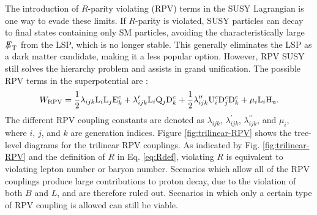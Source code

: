 \documentclass[12pt]{thesis}  %
\providecommand{\PU}{\ensuremath{\cmsSymbolFace{U}}\xspace}
\providecommand{\PD}{\ensuremath{\cmsSymbolFace{D}}\xspace}
\providecommand{\PQ}{\ensuremath{\cmsSymbolFace{Q}}\xspace}
\providecommand{\PE}{\ensuremath{\cmsSymbolFace{E}}\xspace}
\providecommand{\PL}{\ensuremath{\cmsSymbolFace{L}}\xspace}
\def\eslash{\ensuremath{{\hbox{$E$\kern-0.6em\lower-.05ex\hbox{/}\kern0.10em}}}}
\def\met{\mbox{$\eslash_\text{T}$}\xspace} %
\begin{document}
The introduction of $R$-parity violating (RPV) terms in the SUSY Lagrangian is one way to evade these limits. If $R$-parity is violated, SUSY particles can decay to final states containing only SM particles, avoiding the characteristically large \met from the LSP, which is no longer stable. This generally eliminates the LSP as a dark matter candidate, making it a less popular option. However, RPV SUSY still solves the hierarchy problem and assists in grand unification. The possible RPV terms in the superpotential are \cite{Barbier}:
\begin{equation}
W_{\text{RPV}} = \frac{1}{2}\lambda_{ijk}\PL_{i}\PL_{j}\PE_{k}^{c} + \lambda_{ijk}^{\prime}\PL_{i}\PQ_{j}\PD_{k}^{c} + \frac{1}{2}\lambda_{ijk}^{\prime \prime}\PU_{i}^{c}\PD_{j}^{c}\PD_{k}^{c} + \mu_{i}\PL_{i}\Hone. \label{eq:WRPV}
\end{equation}
The different RPV coupling constants are denoted as $\lambda_{ijk}$, $\lambda^{\prime}_{ijk}$, $\lambda^{\prime \prime}_{ijk}$, and $\mu_{i}$, where $i$, $j$, and $k$ are generation indices. Figure \ref{fig:trilinear-RPV} shows the tree-level diagrams for the trilinear RPV couplings. As indicated by Fig. \ref{fig:trilinear-RPV} and the definition of $R$ in Eq. \eqref{eq:Rdef}, violating $R$ is equivalent to violating lepton number or baryon number. Scenarios which allow all of the RPV couplings produce large contributions to proton decay, due to the violation of both $B$ and $L$, and are therefore ruled out. Scenarios in which only a certain type of RPV coupling is allowed can still be viable.
\end{document}

